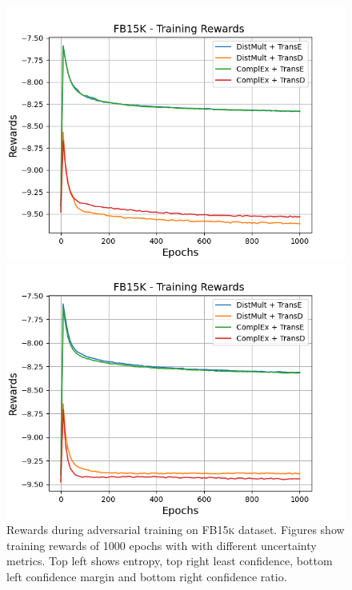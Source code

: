 \begin{figure}[H]
\begin{minipage}{.5\textwidth}
    \end{minipage}
    \begin{minipage}{.5\textwidth}
      \centering
      \includegraphics[width=0.9\linewidth]{figures/results/gan_train/not_pretrained/uncertainty/max_distribution/confidence_margin/fb15k/uncertainty_fb15k_rew.png}
    \end{minipage}%
    \begin{minipage}{.5\textwidth}
      \centering
      \includegraphics[width=0.9\linewidth]{figures/results/gan_train/not_pretrained/uncertainty/max_distribution/confidence_ratio/fb15k/uncertainty_fb15k_rew.png}
    \end{minipage}%
    \caption{Rewards during adversarial training on \textsc{FB15k} dataset. 
    Figures show training rewards of 1000 epochs with \ussoftmax with different uncertainty metrics.
    Top left shows entropy, top right least confidence, 
    bottom left confidence margin and bottom right confidence ratio.}
    \label{fig:advtrain_metrics_fb15k_rew}
\end{figure}